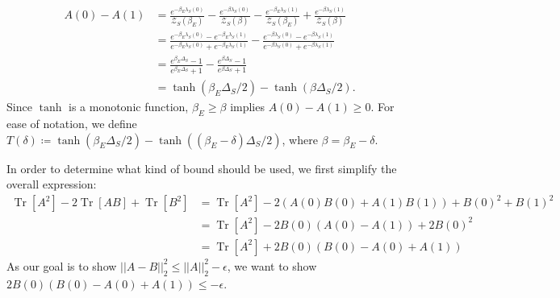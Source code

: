 \documentclass{article}
\newcommand{\brackets}[1]{\left[ #1 \right]}
\newcommand{\norm}[1]{\left| \left| #1 \right| \right|}
\DeclareMathOperator{\Tr}{Tr}
\newcommand{\trace}[1]{\Tr \brackets{ #1 }}
\newcommand{\partfun}{\mathcal{Z}}
\begin{document}
\begin{align}
    A(0) - A(1) &= \frac{e^{-\beta_E \lambda_S(0)}}{\partfun_S(\beta_E)} - \frac{e^{-\beta \lambda_S(0)}}{\partfun_S(\beta)} - \frac{e^{-\beta_E \lambda_S(1)}}{\partfun_S(\beta_E)} + \frac{e^{-\beta \lambda_S(1)}}{\partfun_S(\beta)} \\
    &= \frac{e^{-\beta_E \lambda_S(0)} - e^{-\beta_E \lambda_S(1)}}{e^{-\beta_E \lambda_S(0)} + e^{-\beta_E \lambda_S(1)}} - \frac{e^{-\beta \lambda_S(0)} - e^{-\beta \lambda_S(1)}}{e^{-\beta \lambda_S(0)} + e^{-\beta \lambda_S(1)}} \\
    &= \frac{e^{\beta_E \Delta_S} - 1}{e^{\beta_E \Delta_S} + 1} - \frac{e^{\beta \Delta_S} - 1}{e^{\beta \Delta_S} + 1} \\
    &= \tanh(\beta_E \Delta_S / 2) - \tanh(\beta \Delta_S / 2).
\end{align}
Since $\tanh$ is a monotonic function, $\beta_E \geq \beta$ implies $A(0) - A(1) \geq 0$. For ease of notation, we define $T(\delta) \coloneqq \tanh(\beta_E \Delta_S /2) - \tanh((\beta_E -\delta)\Delta_S/2)$, where $\beta = \beta_E - \delta$.

 In order to determine what kind of bound should be used, we first simplify the overall expression:
\begin{align}
    \trace{A^2} - 2 \trace{AB} + \trace{B^2} &= \trace{A^2} - 2 (A(0) B(0) + A(1)B(1)) + B(0)^2 + B(1)^2 \\
    &= \trace{A^2} - 2 B(0)(A(0) - A(1)) + 2 B(0)^2 \\
    &= \trace{A^2} + 2 B(0)(B(0) - A(0) + A(1)) \label{eq:dist_decrease_a_and_b}
\end{align}
As our goal is to show $\norm{A - B}_2^2 \leq \norm{A}_2^2 - \epsilon$, we want to show $2 B(0) (B(0) -A(0) + A(1)) \leq - \epsilon$.
\end{document}
